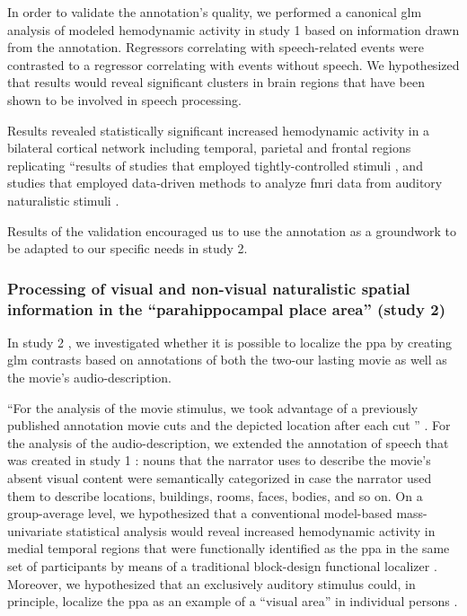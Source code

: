 In order to validate the annotation's quality, we performed a canonical \ac{glm}
analysis of modeled hemodynamic activity in study 1 based on information drawn
from the annotation.
Regressors correlating with speech-related events were contrasted to a regressor
correlating with events without speech.
We hypothesized that results would reveal significant clusters in brain regions
that have been shown to be involved in speech processing.

Results revealed statistically significant increased hemodynamic activity in a
bilateral cortical network including temporal, parietal and frontal regions
replicating ``results of studies that employed tightly-controlled stimuli
\citep[s.][for reviews]{friederici2011brain,
hickok2007cortical,price2012twentyyears}, and studies that employed data-driven
methods to analyze \ac{fmri} data from auditory naturalistic stimuli
\citep{honey2012not, lerner2011topographic, silbert2014coupled}.

Results of the validation encouraged us to use the annotation as a groundwork to
be adapted to our specific needs in study 2.


\subsubsection{Processing of visual and non-visual naturalistic spatial
information in the ``parahippocampal place area'' (study 2)}

In study 2 \citep{haeusler2022processing}, we investigated whether it is
possible to localize the \ac{ppa} by creating \ac{glm} contrasts
based on annotations of both the two-our lasting movie as well as the movie's
audio-description.

``For the analysis of the movie stimulus, we took advantage of a previously
published annotation movie cuts and the depicted location after each cut
\citep{haeusler2016cutanno}'' \citep{haeusler2022processing}.
For the analysis of the audio-description, we extended the annotation of speech
that was created in study 1 \citep{haeusler2021speechanno}:
%
nouns that the narrator uses to describe the movie's absent visual content were
semantically categorized in case the narrator used them to describe locations,
buildings, rooms, faces, bodies, and so on.
On a group-average level, we hypothesized that a conventional model-based
mass-univariate statistical analysis would reveal increased hemodynamic activity
in medial temporal regions that were functionally identified as the \ac{ppa} in
the same set of participants by means of a traditional block-design functional
localizer \citep{sengupta2016extension}.
Moreover, we hypothesized that an exclusively auditory stimulus could, in
principle, localize the \ac{ppa} as an example of a ``visual area'' in
individual persons \citep{haeusler2022processing}.

